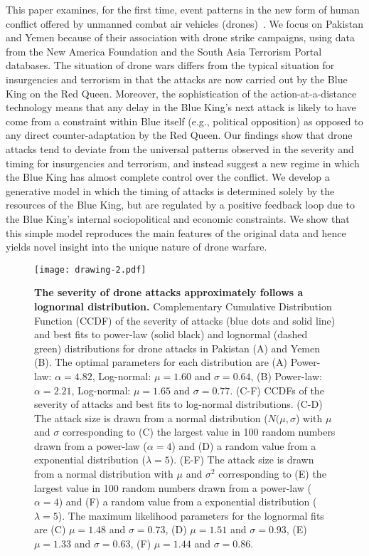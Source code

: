 \documentclass[preprint,12pt]{elsarticle}
\begin{document}
This paper examines, for the first time, event patterns in the new
form of human conflict offered by unmanned combat air vehicles
(drones)~\cite{wars}. We focus on Pakistan and Yemen because of their
association with drone strike campaigns, using data from the New
America Foundation and the South Asia Terrorism Portal
databases. The situation of drone wars differs from the typical
situation for insurgencies and terrorism in that the attacks are now
carried out by the Blue King on the Red Queen. Moreover, the
sophistication of the action-at-a-distance technology means that any
delay in the Blue King's next attack is likely to have come from a
constraint within Blue itself (e.g., political opposition) as opposed
to any direct counter-adaptation by the Red Queen. Our findings show that drone attacks tend to deviate from the universal patterns observed in the
severity and timing for insurgencies and terrorism, and instead suggest a new regime in which the Blue
King has almost complete control over the conflict. We develop a
generative model in which the timing of attacks is
determined solely by the resources of the Blue King, but are regulated
by a positive feedback loop due to the Blue King's internal
sociopolitical and economic constraints. We show that this simple
model reproduces the main features of the original data and hence
yields novel insight into the unique nature of drone warfare.

\begin{figure*}[tp!]
  \centering	
  \texttt{[image: drawing-2.pdf]}  
  \caption{
    \textbf{The severity of drone attacks approximately follows a lognormal distribution.}
    Complementary Cumulative Distribution Function
    (CCDF) of the severity of attacks (blue dots and solid line) and
    best fits to power-law (solid black) and lognormal (dashed green) distributions for drone attacks in Pakistan (A) and Yemen
    (B). The optimal parameters for each distribution are (A)
    Power-law: $\alpha = 4.82$, Log-normal: $\mu = 1.60$ and $\sigma = 0.64$, (B) Power-law: 
    $\alpha = 2.21$, Log-normal: $\mu = 1.65$ and $\sigma = 0.77$.    
    (C-F)  CCDFs of the severity of attacks and best fits to log-normal distributions. (C-D) The attack size is drawn from a 
    normal distribution ($N(\mu,\sigma$) with $\mu$ and $\sigma$ corresponding to (C) the largest value in 100 random numbers drawn from a power-law ($\alpha = 4$) and (D) a random value from a exponential distribution ($\lambda = 5$). (E-F) The attack size is drawn from a normal distribution with $\mu$ and $\sigma^2$ corresponding to (E) the largest value in 100 random numbers drawn from a power-law ($\alpha = 4$) and (F) a random value from a exponential distribution ($\lambda = 5$). The maximum likelihood parameters for the lognormal fits are (C) $\mu = 1.48$ and $\sigma = 0.73$, (D) $\mu = 1.51$ and $\sigma = 0.93$, (E) $\mu = 1.33$ and $\sigma = 0.63$, (F) $\mu = 1.44$ and $\sigma = 0.86$. }
  \label{fig:drones.data}
\end{figure*}
\end{document}
